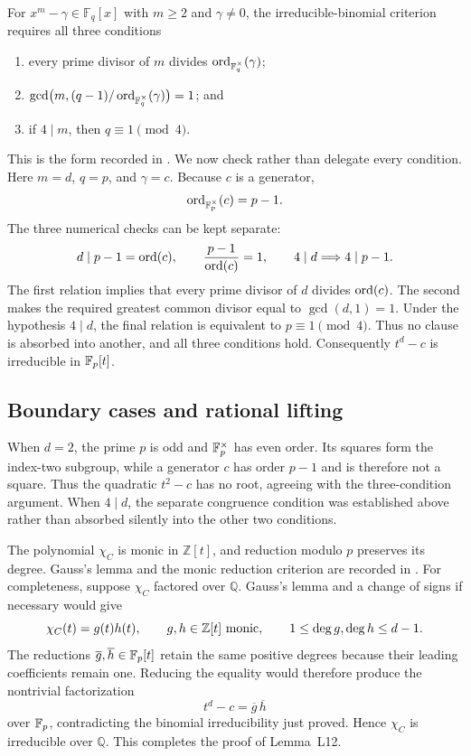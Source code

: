 \documentclass[11pt,letterpaper]{article}
\theoremstyle{plain}
\begin{document}
For $x^m-\gamma\in\mathbb F_q[x]$ with $m\geq2$ and $\gamma\ne0$, the irreducible-binomial criterion requires all three conditions
\begin{enumerate}[label=\textup{(\arabic*)}]
\item every prime divisor of $m$ divides $\operatorname{ord}_{\mathbb F_q^\times}(\gamma)$;
\item $\gcd\bigl(m,(q-1)/\operatorname{ord}_{\mathbb F_q^\times}(\gamma)\bigr)=1$; and
\item if $4\mid m$, then $q\equiv1\pmod4$.
\end{enumerate}
This is the form recorded in \cite[Section 2.1, Lemma 6, p.~4]{HS}.  We now check rather than delegate every condition.  Here $m=d$, $q=p$, and $\gamma=c$.  Because $c$ is a generator,
\[
\operatorname{ord}_{\mathbb{F}_{p}^\times}(c)=p-1.
\]
The three numerical checks can be kept separate:
\[
d\mid p-1=\operatorname{ord}(c),\qquad
\frac{p-1}{\operatorname{ord}(c)}=1,\qquad
4\mid d\Longrightarrow4\mid p-1.
\]
The first relation implies that every prime divisor of $d$ divides $\operatorname{ord}(c)$.  The second makes the required greatest common divisor equal to $\gcd(d,1)=1$.  Under the hypothesis $4\mid d$, the final relation is equivalent to $p\equiv1\pmod4$.  Thus no clause is absorbed into another, and all three conditions hold.  Consequently $t^d-c$ is irreducible in $\mathbb{F}_{p}[t]$.

\subsection{Boundary cases and rational lifting}

When $d=2$, the prime $p$ is odd and $\mathbb{F}_{p}^\times$ has even order.  Its squares form the index-two subgroup, while a generator $c$ has order $p-1$ and is therefore not a square.  Thus the quadratic $t^2-c$ has no root, agreeing with the three-condition argument.  When $4\mid d$, the separate congruence condition was established above rather than absorbed silently into the other two conditions.

The polynomial $\chi_C$ is monic in $\mathbb Z[t]$, and reduction modulo $p$ preserves its degree.  Gauss's lemma and the monic reduction criterion are recorded in \cite[Chapter 9, Sections 9.3--9.4, pp.~303--308]{StdDummit2004AbstractAlgebra}.  For completeness, suppose $\chi_C$ factored over $\mathbb Q$.  Gauss's lemma and a change of signs if necessary would give
\[
\chi_C(t)=g(t)h(t),
\qquad
g,h\in\mathbb Z[t]\ \hbox{monic},
\qquad
1\leq\deg g,\deg h\leq d-1.
\]
The reductions $\overline g,\overline h\in\mathbb{F}_{p}[t]$ retain the same positive degrees because their leading coefficients remain one.  Reducing the equality would therefore produce the nontrivial factorization
\[
t^d-c=\overline g\,\overline h
\]
over $\mathbb{F}_{p}$, contradicting the binomial irreducibility just proved.  Hence $\chi_C$ is irreducible over $\mathbb Q$.  This completes the proof of Lemma~L12.
\end{document}
